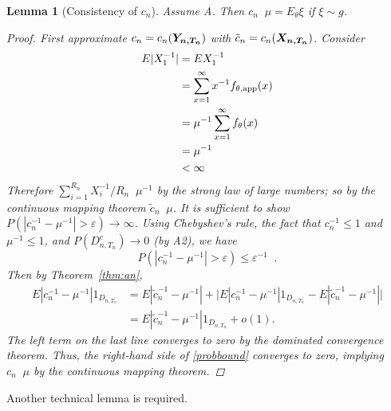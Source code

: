 \documentclass[11 pt]{article}
\newtheorem{lem}{Lemma}
\newcommand{\xra}[1]{\mathop{ \xrightarrow{#1} }}
\newcommand{\fbr}[1]{ \mathop{ \left\{ #1 \right\} } }
\newcommand{\boldXnt}{\mbox{\boldmath $X_{n,T_n}$}}
\newcommand{\boldYnt}{\mbox{\boldmath $Y_{n,T_n}$}}
\newcommand{\Dnt}{D_{n,T_n}}
\begin{document}
\begin{lem}[Consistency of $c_n$]
\label{lem:consistency}
Assume A. Then $c_n \xra{\text{p}} \mu = E_{\theta}\xi$ if $\xi \sim g$.
\begin{proof}
First approximate $c_n = c_n(\boldYnt)$ with $\tilde{c}_n = c_n(\boldXnt)$. Consider 
\begin{align*}
E|X_1^{-1}| &=EX_1^{-1} \\
 &=\sum_{x=1}^{\infty} x^{-1}f_{\theta,\text{app}}(x) \\
 &=\mu^{-1} \sum_{x=1}^{\infty} f_{\theta}(x) \\
 &=\mu^{-1} \\
&< \infty
\end{align*}
Therefore $\sum_{i=1}^{R_n} X_i^{-1}/R_n \xra{\text{a.s.}} \mu^{-1}$ by the strong law of large numbers; so by the continuous mapping theorem $\tilde{c}_n \xra{\text{a.s.}} \mu$. It is sufficient to show $P(|c_n^{-1} - \mu^{-1}| > \varepsilon) \rightarrow \infty$. Using Chebyshev's rule, the fact that $c_n^{-1} \leq 1$ and $\mu^{-1} \leq 1$, and $P(\Dnt^c) \rightarrow 0$ (by A2), we have
\begin{equation} \label{probbound}
P(|c_n^{-1} - \mu^{-1}| > \varepsilon) \leq \varepsilon^{-1} \fbr{ E|c_n^{-1} - \mu^{-1}|1_{\Dnt} + 2o(1)}.
\end{equation}
Then by Theorem~\ref{thm:an},
\begin{align*}
E|c_n^{-1} - \mu^{-1}|1_{\Dnt} &= E|\tilde{c}_n^{-1} - \mu^{-1}| + \bigg | E|c_n^{-1} - \mu^{-1}|1_{\Dnt} - E|\tilde{c}_n^{-1} - \mu^{-1}| \bigg| \\
&= E|\tilde{c}_n^{-1} - \mu^{-1}|1_{\Dnt} + o(1).
\end{align*}
The left term on the last line converges to zero by the dominated convergence theorem. Thus, the right-hand side of \eqref{probbound} converges to zero, implying $c_n \xra{p} \mu$ by the continuous mapping theorem.


\end{proof}
\end{lem}

Another technical lemma is required.
\end{document}
